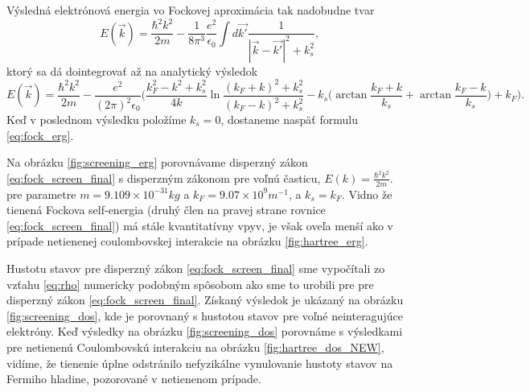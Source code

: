 

Výsledná elektrónová energia vo Fockovej aproximácia tak nadobudne tvar
 \begin{equation}
  \label{eq:fock_screen}
  E(\vec{k})=\frac{\hbar^2 k^2}{2m} - \frac{1}{8\pi^3}  \frac{e^2}{\epsilon_0}  \int d\vec{k'} \frac{1}{|\vec{k}-\vec{k'}|^2+k_s^2} \text{,}
 \end{equation}
 ktorý sa dá dointegrovať až na analytický výsledok
 \begin{equation}
  \label{eq:fock_screen_final}
  E(\vec{k})=\frac{\hbar^2 k^2} {2m} - \frac{e^2}{(2\pi)^2\epsilon_0} \biggl(
    \frac{k_F^2-k^2+k_s^2}{4k} \ln{\frac{(k_F+k)^2+k_s^2}{(k_F-k)^2+k_s^2}}-k_s\bigl(\arctan{\frac{k_F+k}{k_s}}+\arctan{\frac{k_F-k}{k_s}}\bigr)+k_F\biggr) \text{.}
 \end{equation}
 Keď v poslednom výsledku položíme $k_s = 0$, dostaneme naspäť formulu \eqref{eq:fock_erg}.


 Na obrázku \ref{fig:screening_erg} porovnávame disperzný zákon \eqref{eq:fock_screen_final} s disperzným zákonom pre voľnú časticu,
 $E(k)=\frac{\hbar^2 k^2}{2m}$.  pre parametre $m = 9.109 \times 10^{-31} kg$ a $k_F = 9.07 \times 10^{9} m^{-1}$, a $k_s = k_F$. Vidno že tienená Fockova self-energia (druhý člen na pravej strane rovnice \ref{eq:fock_screen_final}) má stále kvantitatívny vpyv, je však oveľa menší ako
 v prípade netienenej coulombovskej interakcie na obrázku \ref{fig:hartree_erg}.


 Hustotu stavov pre disperzný zákon \eqref{eq:fock_screen_final} sme vypočítali zo vzťahu \eqref{eq:rho} numericky podobným spôsobom ako sme to urobili pre
 pre disperzný zákon \eqref{eq:fock_screen_final}. Získaný výsledok je ukázaný na obrázku \ref{fig:screening_dos}, kde je porovnaný
 s hustotou stavov pre voľné neinteragujúce elektróny. Keď výsledky na obrázku \ref{fig:screening_dos} porovnáme s výsledkami pre netienenú Coulombovskú interakciu na obrázku
  \ref{fig:hartree_dos_NEW}, vidíme, že tienenie úplne odstránilo nefyzikálne vynulovanie hustoty stavov na Fermiho hladine, pozorované v netienenom prípade.

